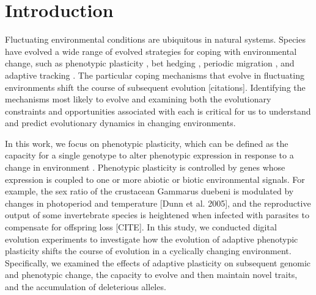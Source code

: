 
\section{Introduction}

Fluctuating environmental conditions are ubiquitous in natural systems. 
Species have evolved a wide range of evolved strategies for coping with environmental change, such as 
phenotypic plasticity \citep{ghalambor_adaptive_2007}, 
bet hedging \citep{simons_modes_2011}, 
periodic migration \citep{winger_long_2019}, 
and adaptive tracking \citep{barrett_adaptation_2008}.
The particular coping mechanisms that evolve in fluctuating environments shift the course of subsequent evolution [citations].
Identifying the mechanisms most likely to evolve and examining both the evolutionary constraints and opportunities associated with each is critical for us to understand and predict evolutionary dynamics in changing environments.

In this work, we focus on phenotypic plasticity, which can be defined as the capacity for a single genotype to alter phenotypic expression in response to a change in environment \citep{west-eberhard_developmental_2003}. 
Phenotypic plasticity is controlled by genes whose expression is coupled to one or more abiotic or biotic environmental signals. 
For example, the sex ratio of the crustacean Gammarus duebeni is modulated by changes in photoperiod and temperature [Dunn et al. 2005], and the reproductive output of some invertebrate species is heightened when infected with parasites to compensate for offspring loss [CITE]. 
In this study, we conducted digital evolution experiments to investigate how the evolution of adaptive phenotypic plasticity shifts the course of evolution in a cyclically changing environment.
Specifically, we examined the effects of adaptive plasticity on subsequent genomic and phenotypic change, the capacity to evolve and then maintain novel traits, and the accumulation of deleterious alleles.


